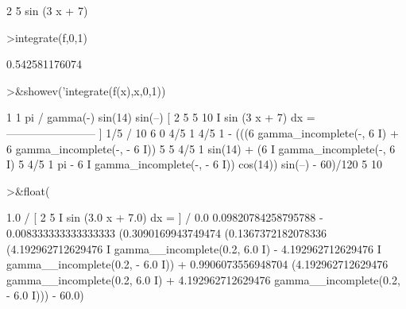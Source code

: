 \documentclass{article}
\begin{document}
\begin{eulernotebook}
\begin{eulercomment}
\begin{eulercomment}
\begin{eulercomment}
\begin{eulercomment}
\begin{euleroutput}
                                 2    5
                              sin (3 x  + 7)
  
\end{euleroutput}
\begin{eulerprompt}
>integrate(f,0,1)
\end{eulerprompt}
\begin{euleroutput}
  0.542581176074
\end{euleroutput}
\begin{eulerprompt}
>&showev('integrate(f(x),x,0,1))
\end{eulerprompt}
\begin{euleroutput}
  
           1                           1              pi
          /                      gamma(-) sin(14) sin(--)
          [     2    5                 5              10
          I  sin (3 x  + 7) dx = ------------------------
          ]                                  1/5
          /                              10 6
           0
         4/5                  1          4/5                  1
   - (((6    gamma_incomplete(-, 6 I) + 6    gamma_incomplete(-, - 6 I))
                              5                               5
               4/5                    1
   sin(14) + (6    I gamma_incomplete(-, 6 I)
                                      5
      4/5                    1                       pi
   - 6    I gamma_incomplete(-, - 6 I)) cos(14)) sin(--) - 60)/120
                             5                       10
  
\end{euleroutput}
\begin{eulerprompt}
>&float(%
\end{eulerprompt}
\begin{euleroutput}
  
           1.0
          /
          [       2      5
          I    sin (3.0 x  + 7.0) dx = 
          ]
          /
           0.0
  0.09820784258795788 - 0.008333333333333333
   (0.3090169943749474 (0.1367372182078336
   (4.192962712629476 I gamma__incomplete(0.2, 6.0 I)
   - 4.192962712629476 I gamma__incomplete(0.2, - 6.0 I))
   + 0.9906073556948704 (4.192962712629476 gamma__incomplete(0.2, 6.0 I)
   + 4.192962712629476 gamma__incomplete(0.2, - 6.0 I))) - 60.0)
  

\end{euleroutput}
\end{eulercomment}
\end{eulercomment}
\end{eulercomment}
\end{eulercomment}
\end{eulernotebook}
\end{document}
